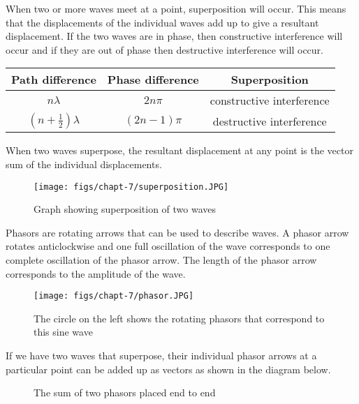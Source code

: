 \documentclass[revision-guide.tex]{subfiles}
\begin{document}
When two or more waves meet at a point, superposition will occur. This means that the displacements of the individual waves add up to give a resultant displacement. If the two waves are in phase, then constructive interference will occur and if they are out of phase then destructive interference will occur.

\begin{center}
\begin{tabular}{c|c|c}
\textbf{Path difference} & \textbf{Phase difference} & \textbf{Superposition}\\
\hline
$n\lambda$ & $2n\pi$ & constructive interference\\
\hline
$(n+\frac{1}{2})\lambda$ & $(2n-1)\pi$ & destructive interference
\end{tabular}
\end{center}


When two waves superpose, the resultant displacement at any point is the vector sum of the individual displacements.

\begin{figure}[h!]
\centering
\texttt{[image: figs/chapt-7/superposition.JPG]}
\caption{Graph showing superposition of two waves}
\end{figure}

Phasors are rotating arrows that can be used to describe waves. A phasor arrow rotates anticlockwise and one full oscillation of the wave corresponds to one complete oscillation of the phasor arrow. The length of the phasor arrow corresponds to the amplitude of the wave.

\begin{figure}[h]
\centering
\texttt{[image: figs/chapt-7/phasor.JPG]}
\caption{The circle on the left shows the rotating phasors that correspond to this sine wave}
\end{figure}

If we have two waves that superpose, their individual phasor arrows at a particular point can be added up as vectors as shown in the diagram below.

\begin{figure}[h]
\centering
{}
\caption{The sum of two phasors placed end to end}
\end{figure}
\end{document}
